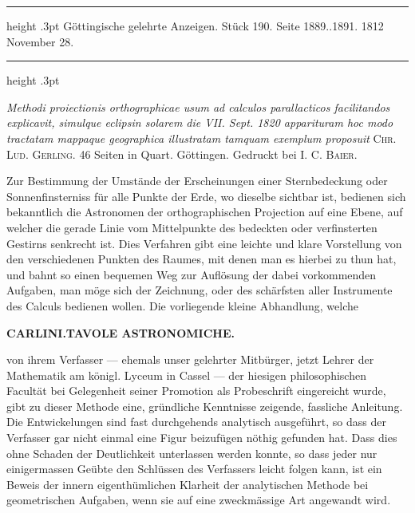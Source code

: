 \par\bigskip
{}
\hypertarget{native-547-lower}{}\label{native-547-lower}
\begin{center}
\parbox{.9\linewidth}{%
\centering\small
\hrule height .3pt\relax\vspace{2.5pt}
Göttingische gelehrte Anzeigen. Stück 190. Seite 1889..1891. 1812 November 28.\par
\vspace{2.5pt}\hrule height .3pt\relax
}
\end{center}
\par\nobreak\medskip

\emph{Methodi proiectionis orthographicae usum ad calculos parallacticos facilitandos explicavit, simulque eclipsin solarem die VII. Sept. \textup{1820} apparituram hoc modo tractatam mappaque geographica illustratam tamquam exemplum proposuit} \textsc{Chr. Lud. Gerling}. 46 Seiten in Quart. Göttingen. Gedruckt bei \textsc{I. C. Baier}.

Zur Bestimmung der Umstände der Erscheinungen einer Sternbedeckung oder Sonnenfinsterniss für alle Punkte der Erde, wo dieselbe sichtbar ist, bedienen sich bekanntlich die Astronomen der orthographischen Projection auf eine Ebene, auf welcher die gerade Linie vom Mittelpunkte des bedeckten oder verfinsterten Gestirns senkrecht ist. Dies Verfahren gibt eine leichte und klare Vorstellung von den verschiedenen Punkten des Raumes, mit denen man es hierbei zu thun hat, und bahnt so einen bequemen Weg zur Auflösung der dabei vorkommenden Aufgaben, man möge sich der Zeichnung, oder des schärfsten aller Instrumente des Calculs bedienen wollen. Die vorliegende kleine Abhandlung, welche\par
\clearpage
\noindent{}%
\makebox[12mm][l]{}%
\parbox[t]{\dimexpr\linewidth-24mm\relax}{\centering\footnotesize\bfseries CARLINI.\enspace TAVOLE ASTRONOMICHE.\par}%
\par\nobreak\medskip
\noindent von ihrem Verfasser --- ehemals unser gelehrter Mitbürger, jetzt Lehrer der Mathematik am königl. Lyceum in Cassel --- der hiesigen philosophischen Facultät bei Gelegenheit seiner Promotion als Probeschrift eingereicht wurde, gibt zu dieser Methode eine, gründliche Kenntnisse zeigende, fassliche Anleitung. Die Entwickelungen sind fast durchgehends analytisch ausgeführt, so dass der Verfasser gar nicht einmal eine Figur beizufügen nöthig gefunden hat. Dass dies ohne Schaden der Deutlichkeit unterlassen werden konnte, so dass jeder nur einigermassen Geübte den Schlüssen des Verfassers leicht folgen kann, ist ein Beweis der innern eigenthümlichen Klarheit der analytischen Methode bei geometrischen Aufgaben, wenn sie auf eine zweckmässige Art angewandt wird.

